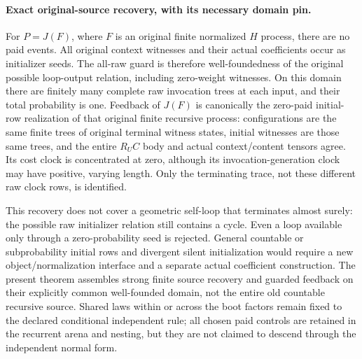 \documentclass[11pt]{article}
\begin{document}
\paragraph{Exact original-source recovery, with its necessary domain pin.}
For $P=J(F)$, where $F$ is an original finite normalized $H$ process, there
are no paid events. All original context witnesses and their actual
coefficients occur as initializer seeds. The all-raw guard is therefore
well-foundedness of the original possible loop-output relation, including
zero-weight witnesses. On this domain there are finitely many complete raw
invocation trees at each input, and their total probability is one. Feedback
of $J(F)$ is canonically the zero-paid initial-row realization of that
original finite recursive process: configurations are the same finite trees
of original terminal witness states, initial witnesses are those same trees,
and the entire $R_U C$ body and actual context/content tensors agree.
Its cost clock is concentrated at zero, although its invocation-generation
clock may have positive, varying length. Only the terminating trace, not
these different raw clock rows, is identified.

This recovery does not cover a geometric self-loop that terminates almost
surely: the possible raw initializer relation still contains a cycle. Even
a loop available only through a zero-probability seed is rejected. General
countable or subprobability initial rows and divergent silent initialization
would require a new object/normalization interface and a separate actual
coefficient construction. The present theorem assembles strong finite source
recovery and guarded feedback on their explicitly common well-founded domain,
not the entire old countable recursive source. Shared laws within or across
the boot factors remain fixed to the declared conditional independent rule;
all chosen paid controls are retained in the recurrent arena and nesting,
but they are not claimed to descend through the independent normal form.
\end{document}
